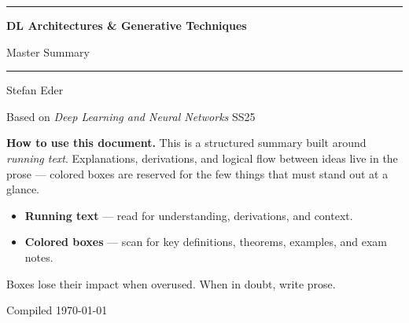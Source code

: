 \documentclass[11pt, oneside]{book}
\newcommand{\coursetitle}{DL Architectures \& Generative Techniques}
\newcommand{\documenttype}{Master Summary}
\newcommand{\authorname}{Stefan Eder}
\newcommand{\basedon}{Based on \emph{Deep Learning and Neural Networks} SS25}
\begin{document}
\frontmatter


\thispagestyle{empty}
\vspace*{1.8cm}

\begin{center}
  {\color{accent}\rule{\linewidth}{1.8pt}}
  \vspace{0.65cm}

  {\fontsize{28}{34}\selectfont\bfseries\color{accent}\coursetitle\par}
  \vspace{0.25cm}
  {\large\color{gray!80!black}\documenttype\par}

  \vspace{0.55cm}
  {\color{accent!35}\rule{\linewidth}{0.5pt}}
  \vspace{0.55cm}

  {\large\authorname\par}
  \vspace{0.2cm}
  {\small\color{gray!70}\basedon\par}
\end{center}

\vspace{1.6cm}

\begin{center}
\begin{minipage}{0.84\textwidth}
  \small\color{gray!80!black}
  \textbf{How to use this document.}\enspace
  This is a structured summary built around \emph{running text}.
  Explanations, derivations, and logical flow between ideas live
  in the prose — colored boxes are reserved for the few things
  that must stand out at a glance.

  \medskip
  \begin{itemize}
    \item \textbf{Running text} — read for understanding, derivations, and context.
    \item \textbf{Colored boxes} — scan for key definitions, theorems, examples, and exam notes.
  \end{itemize}

  \smallskip
  Boxes lose their impact when overused. When in doubt, write prose.
\end{minipage}
\end{center}

\vfill
{\centering\small\color{gray!65} Compiled \today\par}
\clearpage
\end{document}
